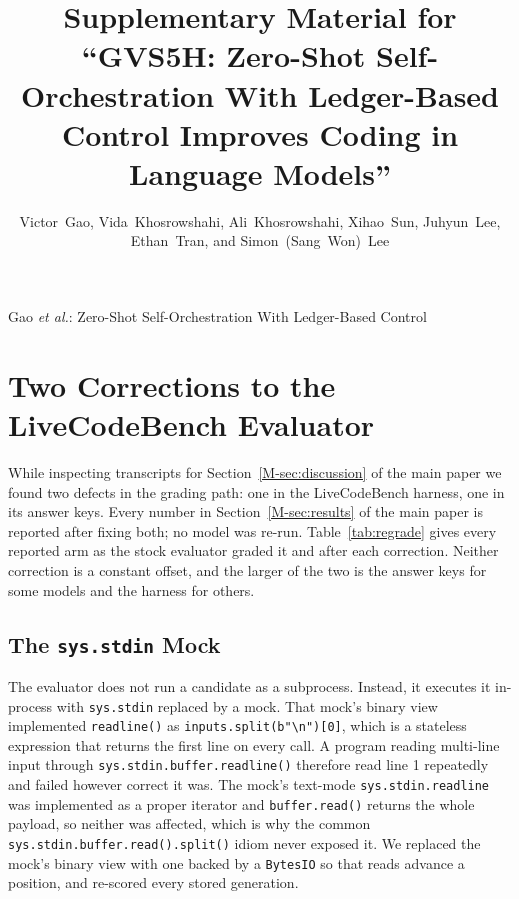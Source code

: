 \documentclass[journal,onecolumn]{IEEEtran}
\begin{document}
\title{Supplementary Material for ``GVS5H: Zero-Shot Self-Orchestration With Ledger-Based
Control Improves Coding in Language Models''}
\author{Victor~Gao, Vida~Khosrowshahi, Ali~Khosrowshahi, Xihao~Sun, Juhyun~Lee,
Ethan~Tran, and Simon~(Sang~Won)~Lee}
%
{Gao \MakeLowercase{\textit{et al.}}: Zero-Shot Self-Orchestration With Ledger-Based Control}
\maketitle

\section{Two Corrections to the LiveCodeBench Evaluator}
\label{app:evaluator}



While inspecting transcripts for Section~\ref{M-sec:discussion} of the main paper we found two defects in the grading
path: one in the LiveCodeBench harness, one in its answer keys. Every number in
Section~\ref{M-sec:results} of the main paper is reported after fixing both; no model was re-run.
Table~\ref{tab:regrade} gives every reported arm as the stock evaluator graded it and after each
correction. Neither correction is a constant offset, and the larger of the two is the answer keys
for some models and the harness for others.

\subsection{The \texttt{sys.stdin} Mock} The evaluator does not run a candidate as a subprocess.
Instead, it executes it in-process with
\texttt{sys.stdin} replaced by a mock. That mock's binary view implemented \texttt{readline()} as
\texttt{inputs.split(b"\textbackslash n")[0]}, which is a stateless expression that returns the
first line on every call. A program reading multi-line input through
\texttt{sys.stdin.buffer.readline()} therefore read line 1 repeatedly and failed however correct it
was. The mock's text-mode \texttt{sys.stdin.readline} was implemented as a proper iterator and
\texttt{buffer.read()} returns the whole payload, so neither was affected, which is why the
common \texttt{sys.stdin.buffer.read().split()} idiom never exposed it. We replaced the mock's
binary view with one backed by a \texttt{BytesIO} so that reads advance a position, and re-scored
every stored generation.
\end{document}
